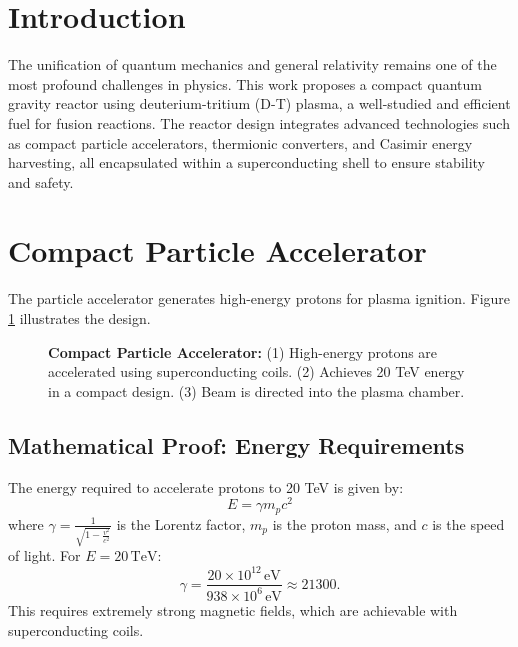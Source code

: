 \documentclass[12pt, a4paper]{article}
\begin{document}
\section{Introduction}
The unification of quantum mechanics and general relativity remains one of the most profound challenges in physics. This work proposes a compact quantum gravity reactor using deuterium-tritium (D-T) plasma, a well-studied and efficient fuel for fusion reactions. The reactor design integrates advanced technologies such as compact particle accelerators, thermionic converters, and Casimir energy harvesting, all encapsulated within a superconducting shell to ensure stability and safety.

\section{Compact Particle Accelerator}
The particle accelerator generates high-energy protons for plasma ignition. Figure \ref{fig:compact_accelerator} illustrates the design.

\begin{figure}[H]
\centering
{}
\caption{
\textbf{Compact Particle Accelerator:} 
(1) High-energy protons are accelerated using superconducting coils. 
(2) Achieves 20 TeV energy in a compact design. 
(3) Beam is directed into the plasma chamber.
}
\label{fig:compact_accelerator}
\end{figure}

\subsection{Mathematical Proof: Energy Requirements}
The energy required to accelerate protons to 20 TeV is given by:
\[
E = \gamma m_p c^2
\]
where \( \gamma = \frac{1}{\sqrt{1 - \frac{v^2}{c^2}}} \) is the Lorentz factor, \( m_p \) is the proton mass, and \( c \) is the speed of light. For \( E = 20 \, \text{TeV} \):
\[
\gamma = \frac{20 \times 10^{12} \, \text{eV}}{938 \times 10^6 \, \text{eV}} \approx 21300.
\]
This requires extremely strong magnetic fields, which are achievable with superconducting coils.
\end{document}
